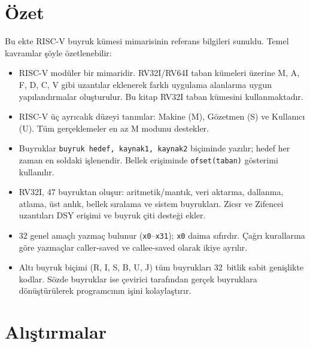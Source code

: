 \section*{Özet}

Bu ekte RISC-V buyruk kümesi mimarisinin referans bilgileri sunuldu. Temel kavramlar şöyle özetlenebilir:

\begin{itemize}
\item RISC-V modüler bir mimaridir. RV32I/RV64I taban kümeleri üzerine M, A, F, D, C, V gibi uzantılar eklenerek farklı uygulama alanlarına uygun yapılandırmalar oluşturulur. Bu kitap RV32I taban kümesini kullanmaktadır.

\item RISC-V üç ayrıcalık düzeyi tanımlar: Makine (M), Gözetmen (S) ve Kullanıcı (U). Tüm gerçeklemeler en az M modunu destekler.

\item Buyruklar \texttt{buyruk hedef, kaynak1, kaynak2} biçiminde yazılır; hedef her zaman en soldaki işlenendir. Bellek erişiminde \texttt{ofset(taban)} gösterimi kullanılır.

\item RV32I, 47 buyruktan oluşur: aritmetik/mantık, veri aktarma, dallanma, atlama, üst anlık, bellek sıralama ve sistem buyrukları. Zicsr ve Zifencei uzantıları DSY erişimi ve buyruk çiti desteği ekler.

\item 32 genel amaçlı yazmaç bulunur (\texttt{x0}--\texttt{x31}); \texttt{x0} daima sıfırdır. Çağrı kurallarına göre yazmaçlar caller-saved ve callee-saved olarak ikiye ayrılır.

\item Altı buyruk biçimi (R, I, S, B, U, J) tüm buyrukları 32~bitlik sabit genişlikte kodlar. Sözde buyruklar ise çevirici tarafından gerçek buyruklara dönüştürülerek programcının işini kolaylaştırır.
\end{itemize}


\section*{Alıştırmalar}
\label{sec:ekC-alistirmalar}

